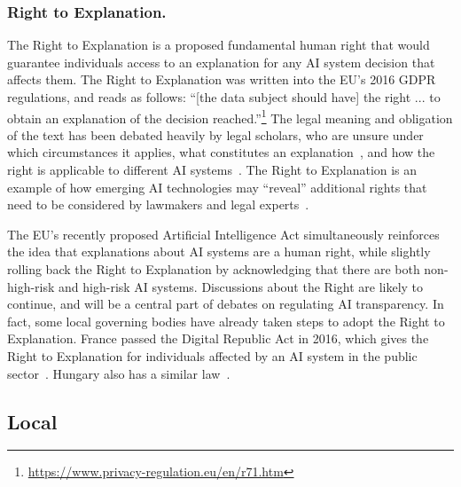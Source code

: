 \subsubsection{Right to Explanation.}

The Right to Explanation is a proposed fundamental human right that would guarantee individuals access to an explanation for any AI system decision that affects them. The Right to Explanation was written into the EU's 2016 GDPR regulations, and reads as follows: ``[the data subject should have] the right ... to obtain an explanation of the decision reached.''\footnote{\url{https://www.privacy-regulation.eu/en/r71.htm}} The legal meaning and obligation of the text has been debated heavily by legal scholars, who are unsure under which circumstances it applies, what constitutes an explanation~\cite{DBLP:conf/fat/SelbstP18}, and %
how the right is applicable to different AI systems~\cite{doshi2017accountability}. The Right to Explanation is an example of how emerging AI technologies may ``reveal'' additional rights that need to be considered by lawmakers and legal experts~\cite{10.1145/3306618.3314274}.

The EU's recently proposed Artificial Intelligence Act simultaneously reinforces the idea that explanations about AI systems are a human right, while slightly rolling back the Right to Explanation by acknowledging that there are both non-high-risk and high-risk AI systems. Discussions about the Right are likely to continue, and will be a central part of debates on regulating AI transparency. In fact, some local governing bodies have already taken steps to adopt the Right to Explanation. France passed the Digital Republic Act in 2016, which gives the Right to Explanation for individuals affected by an AI system in the public sector~\cite{edwards2018enslaving}. Hungary also has a similar law~\cite{malgieri2019automated}.

\subsection{Local}

